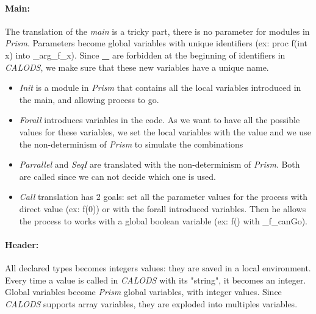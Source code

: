 \documentclass{article}
\begin{document}
\paragraph{Main:}
\label{sec:init}
The translation of the \textit{main} is a tricky part, there is no parameter for modules in \textit{Prism}. Parameters become global variables with unique identifiers (ex:   proc f(int x) into \_arg\_f\_x). Since \textbf{\_}  are forbidden at the beginning of identifiers in \textit{CALODS}, we make sure that these new variables have a unique name.
\begin{itemize}
  \item{\textit{Init} is a module in \textit{Prism} that contains all the local variables introduced in the main, and allowing process to go. }
  \item{ \textit{Forall} introduces variables in the code. As we want to have all the possible values for these variables, we set the local variables with the value and we use the non-determinism of \textit{Prism} to simulate the combinations}
  \item{\textit{Parrallel} and \textit{SeqI} are translated with the non-determinism of \textit{Prism}. Both are called since we can not decide which one is used. }
  \item{\textit{Call} translation has 2 goals: set all the parameter values for the process with direct value (ex: f(0)) or with the forall introduced variables. Then he allows the process to works with a global boolean variable (ex: f() with _f_canGo). }
\end{itemize}

\paragraph{Header:}
All declared types becomes integers values: they are saved in a local environment. Every time a value is called in \textit{CALODS} with its "string", it becomes an integer. Global variables become \textit{Prism} global variables, with integer values. Since \textit{CALODS} supports array variables, they are exploded into multiples variables.
\end{document}
